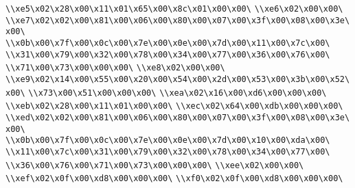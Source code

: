 \verb|\\xe5\x02\x28\x00\x11\x01\x65\x00\x8c\x01\x00\x00\|\newline
\verb|\\xe6\x02\x00\x00\|\newline
\verb|\\xe7\x02\x02\x00\x81\x00\x06\x00\x80\x00\x07\x00\x3f\x00\x08\x00\x3e\x00\|\newline
\verb|\\x0b\x00\x7f\x00\x0c\x00\x7e\x00\x0e\x00\x7d\x00\x11\x00\x7c\x00\|\newline
\verb|\\x31\x00\x79\x00\x32\x00\x78\x00\x34\x00\x77\x00\x36\x00\x76\x00\|\newline
\verb|\\x71\x00\x73\x00\x00\x00\|\newline
\verb|\\xe8\x02\x00\x00\|\newline
\verb|\\xe9\x02\x14\x00\x55\x00\x20\x00\x54\x00\x2d\x00\x53\x00\x3b\x00\x52\x00\|\newline
\verb|\\x73\x00\x51\x00\x00\x00\|\newline
\verb|\\xea\x02\x16\x00\xd6\x00\x00\x00\|\newline
\verb|\\xeb\x02\x28\x00\x11\x01\x00\x00\|\newline
\verb|\\xec\x02\x64\x00\xdb\x00\x00\x00\|\newline
\verb|\\xed\x02\x02\x00\x81\x00\x06\x00\x80\x00\x07\x00\x3f\x00\x08\x00\x3e\x00\|\newline
\verb|\\x0b\x00\x7f\x00\x0c\x00\x7e\x00\x0e\x00\x7d\x00\x10\x00\xda\x00\|\newline
\verb|\\x11\x00\x7c\x00\x31\x00\x79\x00\x32\x00\x78\x00\x34\x00\x77\x00\|\newline
\verb|\\x36\x00\x76\x00\x71\x00\x73\x00\x00\x00\|\newline
\verb|\\xee\x02\x00\x00\|\newline
\verb|\\xef\x02\x0f\x00\xd8\x00\x00\x00\|\newline
\verb|\\xf0\x02\x0f\x00\xd8\x00\x00\x00\|\newline
